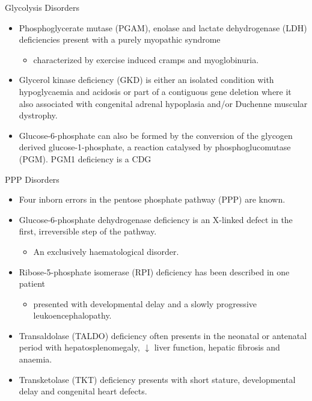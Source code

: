 \documentclass[presentation, smaller]{beamer}
\begin{document}
\begin{frame}[label={sec:orge2452c9}]{Glycolysis Disorders}
\begin{itemize}
\item Phosphoglycerate mutase (PGAM), enolase and lactate dehydrogenase
(LDH) deficiencies present with a purely myopathic syndrome
\begin{itemize}
\item characterized by exercise induced cramps and myoglobinuria.
\end{itemize}

\item Glycerol kinase deficiency (GKD) is either an isolated condition
with hypoglycaemia and acidosis or part of a contiguous
gene deletion where it also associated with congenital adrenal
hypoplasia and/or Duchenne muscular dystrophy.

\item Glucose-6-phosphate can also be formed by the conversion of the
glycogen derived glucose-1-phosphate, a reaction catalysed by
phosphoglucomutase (PGM). PGM1 deficiency is a CDG
\end{itemize}
\end{frame}

\begin{frame}[label={sec:org1ab88bf}]{PPP Disorders}
\begin{itemize}
\item Four inborn errors in the pentose phosphate pathway (PPP) are known.
\item Glucose-6-phosphate dehydrogenase deficiency is an X-linked defect
in the first, irreversible step of the pathway.
\begin{itemize}
\item An exclusively haematological disorder.
\end{itemize}
\item Ribose-5-phosphate isomerase (RPI) deficiency has been described in one patient
\begin{itemize}
\item presented with developmental delay and a slowly progressive leukoencephalopathy.
\end{itemize}
\item Transaldolase (TALDO) deficiency often presents in the neonatal or
antenatal period with hepatosplenomegaly, \(\downarrow\) liver function,
hepatic fibrosis and anaemia.
\item Transketolase (TKT) deficiency presents with short stature,
developmental delay and congenital heart defects.
\end{itemize}
\end{frame}
\end{document}
